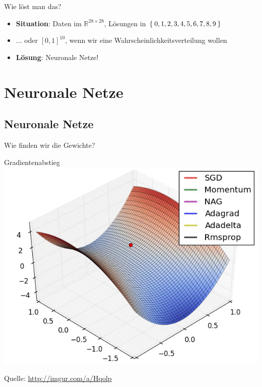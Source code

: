\begin{frame}{Wie löst man das?}
    \begin{itemize}[<+->]
        \item \textbf{Situation}: Daten im $\mathbb{R}^{28 \times 28}$,
              Lösungen in $\Set{0, 1, 2, 3, 4, 5, 6, 7, 8, 9}$
        \item ... oder $[0, 1]^{10}$, wenn wir eine Wahrscheinlichkeitsverteilung wollen
        \item \textbf{Lösung}: Neuronale Netze!
    \end{itemize}
\end{frame}

\section{Neuronale Netze}
\subsection{Neuronale Netze}

\begin{frame}{}
    \begin{center}
        \Huge Wie finden wir die Gewichte?


    \end{center}
\end{frame}


\begin{frame}{Gradientenabstieg}
    \includegraphics[width=\textwidth, height=0.8\textheight, keepaspectratio]{../presentation-images/visualizing-optimization-algos-0.png}

    Quelle: \href{http://imgur.com/a/Hqolp}{http://imgur.com/a/Hqolp}
\end{frame}


